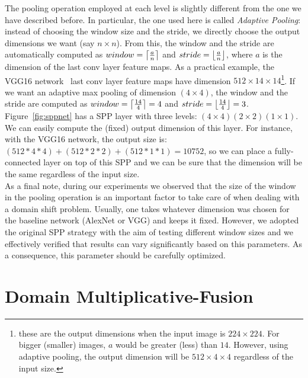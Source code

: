 \documentclass[../main.tex]{subfiles}
\begin{document}
    The pooling operation employed at each level is slightly different from the
    one we have described before. In particular, the one used here is called \textit{Adaptive Pooling}: instead of choosing the window size and the
    stride, we directly choose the output dimensions we want (say $n \times n$). From this, the window and the stride are automatically computed
    as $window = \ceil*{\frac{a}{n}}$ and $stride = \floor*{\frac{a}{n}}$, where $a$ is the dimension of the last conv layer feature maps. As a
    practical example, the VGG16 network~\cite{vgg16} last conv layer feature maps have dimension $512 \times 14 \times 14$\footnote{these are
    the output dimensions when the input image is $224 \times 224$. For bigger (smaller) images, $a$ would be greater (less) than $14$.
    However, using adaptive pooling, the output dimension will be $512 \times 4 \times 4$ regardless of the input size.}.
    If we want an adaptive max pooling of dimension $(4 \times 4)$, the window and the stride are computed as
    $window = \ceil*{\frac{14}{4}} = 4$ and $stride = \floor*{\frac{14}{4}} = 3$. Figure~\ref{fig:sppnet} has a SPP layer with three levels:
    $(4 \times 4) (2 \times 2) (1 \times 1)$. We can easily compute the (fixed) output dimension of this layer. For instance, with the VGG16
    network, the output size is: $(512*4*4) + (512*2*2) + (512*1*1) = 10752$, so we can place a fully-connected layer on top of this SPP and
    we can be sure that the dimension will be the same regardless of the input size. \\

	As a final note, during our experiments we observed that the size of the window in the pooling operation is an important factor to take care of
	when dealing with a domain shift problem. Usually, one takes whatever dimension was chosen for the baseline network (AlexNet or VGG)
	and keeps it fixed. However, we adopted the original SPP strategy with the aim of testing different window sizes and we effectively
	verified that results can vary significantly based on this parameters. As a consequence, this parameter should be carefully optimized.

    \section{Domain Multiplicative-Fusion}
\end{document}
